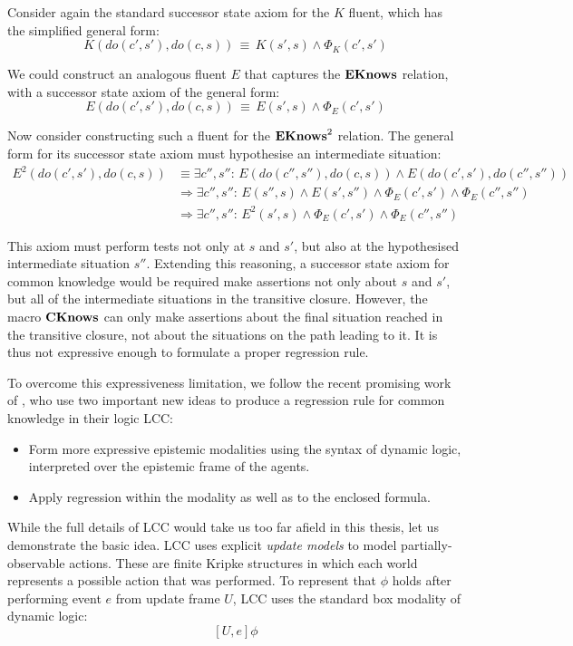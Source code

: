 Consider again the standard successor state axiom for the $K$ fluent,
which has the simplified general form:\[
K(do(c',s'),do(c,s))\,\equiv\, K(s',s)\wedge\Phi_{K}(c',s')\]


We could construct an analogous fluent $E$ that captures the $\mathbf{EKnows}$
relation, with a successor state axiom of the general form:\[
E(do(c',s'),do(c,s))\,\equiv\, E(s',s)\wedge\Phi_{E}(c',s')\]


Now consider constructing such a fluent for the $\mathbf{EKnows}^{2}$ relation.
The general form for its successor state axiom must hypothesise an
intermediate situation:\begin{align*}
E^{2}(do(c',s'),do(c,s)) & \equiv\exists c'',s'':\, E(do(c'',s''),do(c,s))\wedge E(do(c',s'),do(c'',s''))\\
 & \Rightarrow\exists c'',s'':\, E(s'',s)\wedge E(s',s'')\wedge\Phi_{E}(c',s')\wedge\Phi_{E}(c'',s'')\\
 & \Rightarrow\exists c'',s'':\, E^{2}(s',s)\wedge\Phi_{E}(c',s')\wedge\Phi_{E}(c'',s'')\end{align*}


This axiom must perform tests not only at $s$ and $s'$, but also
at the hypothesised intermediate situation $s''$. Extending this
reasoning, a successor state axiom for common knowledge would be required
make assertions not only about $s$ and $s'$, but all of the intermediate
situations in the transitive closure. However, the macro $\mathbf{CKnows}$
can only make assertions about the final situation reached in the
transitive closure, not about the situations on the path leading to
it. It is thus not expressive enough to formulate a proper regression
rule.

To overcome this expressiveness limitation, we follow the recent promising
work of \citet{vanBenthem06lcc}, who use two important new ideas
to produce a regression rule for common knowledge in their logic LCC:

\begin{itemize}
\item Form more expressive epistemic modalities using the syntax of dynamic
logic, interpreted over the epistemic frame of the agents. 
\item Apply regression within the modality as well as to the enclosed formula. 
\end{itemize}
While the full details of LCC would take us too far afield in this
thesis, let us demonstrate the basic idea. LCC uses explicit \emph{update
models} to model partially-observable actions. These are finite Kripke
structures in which each world represents a possible action that was
performed. To represent that $\phi$ holds after performing event
$e$ from update frame $U$, LCC uses the standard box modality of
dynamic logic:\[
[U,e]\phi\]


